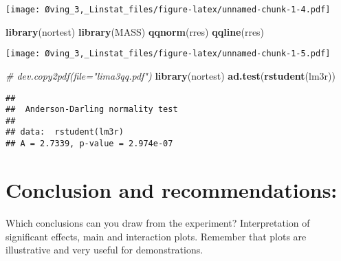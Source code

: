 \documentclass[]{article}
\newenvironment{Shaded}{\begin{snugshade}}{\end{snugshade}}
\newcommand{\KeywordTok}[1]{\textcolor[rgb]{0.13,0.29,0.53}{\textbf{#1}}}
\newcommand{\CommentTok}[1]{\textcolor[rgb]{0.56,0.35,0.01}{\textit{#1}}}
\newcommand{\NormalTok}[1]{#1}
\begin{document}
\texttt{[image: Øving\_3,\_Linstat\_files/figure-latex/unnamed-chunk-1-4.pdf]}

\begin{Shaded}
\begin{Highlighting}[]
\KeywordTok{library}\NormalTok{(nortest)}
\KeywordTok{library}\NormalTok{(MASS)}
\KeywordTok{qqnorm}\NormalTok{(rres)}
\KeywordTok{qqline}\NormalTok{(rres)}
\end{Highlighting}
\end{Shaded}

\texttt{[image: Øving\_3,\_Linstat\_files/figure-latex/unnamed-chunk-1-5.pdf]}

\begin{Shaded}
\begin{Highlighting}[]
\CommentTok{# dev.copy2pdf(file="lima3qq.pdf")}
\KeywordTok{library}\NormalTok{(nortest)}
\KeywordTok{ad.test}\NormalTok{(}\KeywordTok{rstudent}\NormalTok{(lm3r))}
\end{Highlighting}
\end{Shaded}

\begin{verbatim}
## 
##  Anderson-Darling normality test
## 
## data:  rstudent(lm3r)
## A = 2.7339, p-value = 2.974e-07
\end{verbatim}

\section{Conclusion and
recommendations:}\label{conclusion-and-recommendations}

Which conclusions can you draw from the experiment? Interpretation of
significant effects, main and interaction plots. Remember that plots are
illustrative and very useful for demonstrations.
\end{document}
